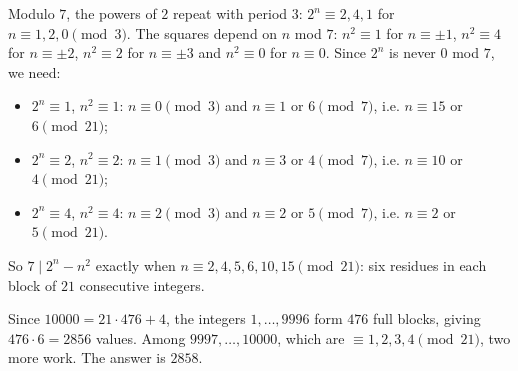 Modulo $7$, the powers of $2$ repeat with period $3$: $2^n\equiv2,4,1$ for $n\equiv1,2,0\pmod3$. The squares depend on $n$ mod $7$: $n^2\equiv1$ for $n\equiv\pm1$, $n^2\equiv4$ for $n\equiv\pm2$, $n^2\equiv2$ for $n\equiv\pm3$ and $n^2\equiv0$ for $n\equiv0$. Since $2^n$ is never $0$ mod $7$, we need:
\begin{itemize}
\item $2^n\equiv1$, $n^2\equiv1$: $n\equiv0\pmod3$ and $n\equiv1$ or $6\pmod7$, i.e. $n\equiv15$ or $6\pmod{21}$;
\item $2^n\equiv2$, $n^2\equiv2$: $n\equiv1\pmod3$ and $n\equiv3$ or $4\pmod7$, i.e. $n\equiv10$ or $4\pmod{21}$;
\item $2^n\equiv4$, $n^2\equiv4$: $n\equiv2\pmod3$ and $n\equiv2$ or $5\pmod7$, i.e. $n\equiv2$ or $5\pmod{21}$.
\end{itemize}
So $7\mid2^n-n^2$ exactly when $n\equiv2,4,5,6,10,15\pmod{21}$: six residues in each block of $21$ consecutive integers.

Since $10000=21\cdot476+4$, the integers $1,\dots,9996$ form $476$ full blocks, giving $476\cdot6=2856$ values. Among $9997,\dots,10000$, which are $\equiv1,2,3,4\pmod{21}$, two more work. The answer is $\boxed{2858}$.
